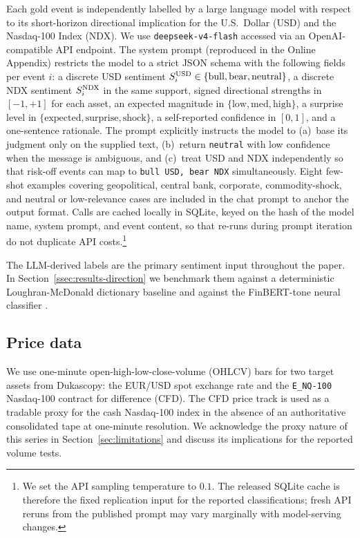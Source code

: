Each gold event is independently labelled by a large language model
with respect to its short-horizon directional implication for the
U.S.~Dollar (USD) and the Nasdaq-100 Index (NDX). We use
\texttt{deepseek-v4-flash} accessed via an OpenAI-compatible API
endpoint. The system prompt (reproduced in the Online Appendix)
restricts the model to a strict JSON schema with the following
fields per event $i$: a discrete USD sentiment
$S^{\mathrm{USD}}_i \in \{\text{bull}, \text{bear}, \text{neutral}\}$, a
discrete NDX sentiment $S^{\mathrm{NDX}}_i$ in the same support, signed
directional strengths in $[-1, +1]$ for each asset, an expected
magnitude in $\{\text{low}, \text{med}, \text{high}\}$, a surprise
level in $\{\text{expected}, \text{surprise}, \text{shock}\}$, a
self-reported confidence in $[0, 1]$, and a one-sentence rationale.
The prompt explicitly instructs the model to (a)~base its judgment
only on the supplied text, (b)~return \texttt{neutral} with low
confidence when the message is ambiguous, and (c)~treat USD and NDX
independently so that risk-off events can map to
\texttt{bull USD, bear NDX} simultaneously. Eight few-shot examples
covering geopolitical, central bank, corporate, commodity-shock,
and neutral or low-relevance cases are included in the chat prompt
to anchor the output format. Calls are cached locally in SQLite,
keyed on the hash of the model name, system prompt, and event
content, so that re-runs during prompt iteration do not duplicate
API costs.\footnote{We set the API sampling temperature to $0.1$.
The released SQLite cache is therefore the fixed replication input
for the reported classifications; fresh API reruns from the
published prompt may vary marginally with model-serving changes.}

The LLM-derived labels are the primary sentiment input throughout
the paper. In Section~\ref{ssec:results-direction} we benchmark them
against a deterministic Loughran-McDonald dictionary baseline
\citep{loughran2011liability} and against the FinBERT-tone neural
classifier \citep{yang2020finbert}.

\subsection{Price data}
\label{ssec:price-data}

We use one-minute open-high-low-close-volume (OHLCV) bars for two
target assets from Dukascopy: the EUR/USD spot exchange rate and the
\texttt{E\_NQ-100} Nasdaq-100 contract for difference (CFD). The
CFD price track is used as a tradable proxy for the cash Nasdaq-100
index in the absence of an authoritative consolidated tape at
one-minute resolution. We acknowledge the proxy nature of this
series in Section~\ref{sec:limitations} and discuss its implications
for the reported volume tests.

